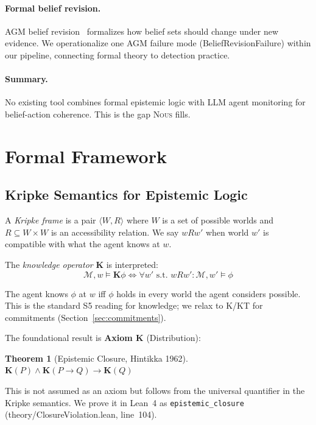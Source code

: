 \documentclass[11pt]{article}
\newtheorem{theorem}{Theorem}[section]
\newcommand{\K}{\mathbf{K}}       %
\newcommand{\nous}{\textsc{Nous}} %
\begin{document}
\paragraph{Formal belief revision.}
AGM belief revision~\citep{agm1985} formalizes how belief sets should
change under new evidence. We operationalize one AGM failure mode
(BeliefRevisionFailure) within our pipeline, connecting formal theory
to detection practice.

\paragraph{Summary.}
No existing tool combines formal epistemic logic with LLM agent monitoring
for belief-action coherence. This is the gap \nous{} fills.

\section{Formal Framework}
\label{sec:formal}

\subsection{Kripke Semantics for Epistemic Logic}
\label{sec:kripke}

A \emph{Kripke frame} is a pair $\langle W, R \rangle$ where $W$ is a set of
possible worlds and $R \subseteq W \times W$ is an accessibility relation.
We say $wRw'$ when world $w'$ is compatible with what the agent knows at $w$.

The \emph{knowledge operator} $\K$ is interpreted:
\[
  \mathcal{M}, w \models \K\phi \iff \forall w' \text{ s.t. } wRw': \mathcal{M}, w' \models \phi
\]

The agent knows $\phi$ at $w$ iff $\phi$ holds in every world the agent
considers possible. This is the standard S5 reading for knowledge; we relax
to K/KT for commitments (Section~\ref{sec:commitments}).

The foundational result is \textbf{Axiom K} (Distribution):
\begin{theorem}[Epistemic Closure, Hintikka 1962]
  \label{thm:axiomk}
  $\K(P) \wedge \K(P \to Q) \to \K(Q)$
\end{theorem}
This is not assumed as an axiom but follows from the universal quantifier in
the Kripke semantics. We prove it in Lean~4 as \texttt{epistemic\_closure}
(theory/ClosureViolation.lean, line~104).
\end{document}
